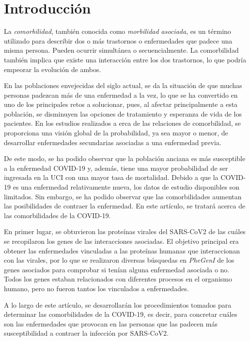 \section{Introducción}

La \textit{comorbilidad}, también conocida como \textit{morbilidad asociada}, es un término utilizado para describir dos o más trastornos o enfermedades que padece una misma persona. Pueden ocurrir simultánea o secuencialmente. La comorbilidad también implica que existe una interacción entre los dos trastornos, lo que podría empeorar la evolución de ambos.

\newline

En las poblaciones envejecidas del siglo actual, se da la situación de que muchas personas padezcan más de una enfermedad a la vez, lo que se ha convertido en uno de los principales retos a solucionar, pues, al afectar principalmente a esta población, se disminuyen las opciones de tratamiento y esperanza de vida de los pacientes. En los estudios realizados a erca de las relaciones de comorbilidad, se proporciona una visión global de la probabilidad, ya sea mayor o menor, de desarrollar enfermedades secundarias asociadas a una enfermedad previa.

\newline

De este modo, se ha podido observar que la población anciana es más susceptible a la enfermedad COVID-19 y, además, tiene una mayor probabilidad de ser ingresada en la UCI con una mayor tasa de mortalidad. 
Debido a que la COVID-19 es una enfermedad relativamente nueva, los datos de estudio disponibles son limitados. Sin embargo, se ha podido observar que las comorbilidades aumentan las posibilidades de contraer la enfermedad. En este artículo, se tratará acerca de las comorbilidades de la COVID-19.

\newline

En primer lugar, se obtuvieron las proteínas virales del SARS-CoV2 de las cuáles se recopilaron los genes de las interacciones asociadas. El objetivo principal era obtener las enfermedades vinculadas a las proteínas humanas que interaccionan con las virales, por lo que se realizaron diversas búsquedas en \textit{PheGenI} de los genes asociados para comprobar si tenían alguna enfermedad asociada o no. Todos los genes estaban relacionados con diferentes procesos en el organismo humano, pero no fueron tantos los vinculados a enfermedades.

\newline

A lo largo de este artículo, se desarrollarán los procedimientos tomados para determinar las comorbilidades de la COVID-19, es decir, para concretar cuáles son las enfermedades que provocan en las personas que las padecen más susceptibilidad a contraer la infección por SARS-CoV2.
